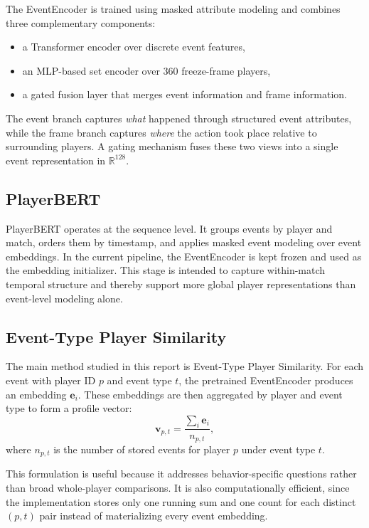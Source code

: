 \documentclass[11pt]{article}
\begin{document}
The EventEncoder is trained using masked attribute modeling and combines three complementary components:
\begin{itemize}[leftmargin=*]
  \item a Transformer encoder over discrete event features,
  \item an MLP-based set encoder over 360 freeze-frame players,
  \item a gated fusion layer that merges event information and frame information.
\end{itemize}

The event branch captures \emph{what} happened through structured event attributes, while the frame branch captures \emph{where} the action took place relative to surrounding players. A gating mechanism fuses these two views into a single event representation in $\mathbb{R}^{128}$.

\subsection{PlayerBERT}

PlayerBERT operates at the sequence level. It groups events by player and match, orders them by timestamp, and applies masked event modeling over event embeddings. In the current pipeline, the EventEncoder is kept frozen and used as the embedding initializer. This stage is intended to capture within-match temporal structure and thereby support more global player representations than event-level modeling alone.

\subsection{Event-Type Player Similarity}

The main method studied in this report is Event-Type Player Similarity. For each event with player ID $p$ and event type $t$, the pretrained EventEncoder produces an embedding $\mathbf{e}_i$. These embeddings are then aggregated by player and event type to form a profile vector:
\[
\mathbf{v}_{p,t} = \frac{\sum_i \mathbf{e}_i}{n_{p,t}},
\]
where $n_{p,t}$ is the number of stored events for player $p$ under event type $t$.

This formulation is useful because it addresses behavior-specific questions rather than broad whole-player comparisons. It is also computationally efficient, since the implementation stores only one running sum and one count for each distinct $(p,t)$ pair instead of materializing every event embedding.
\end{document}
